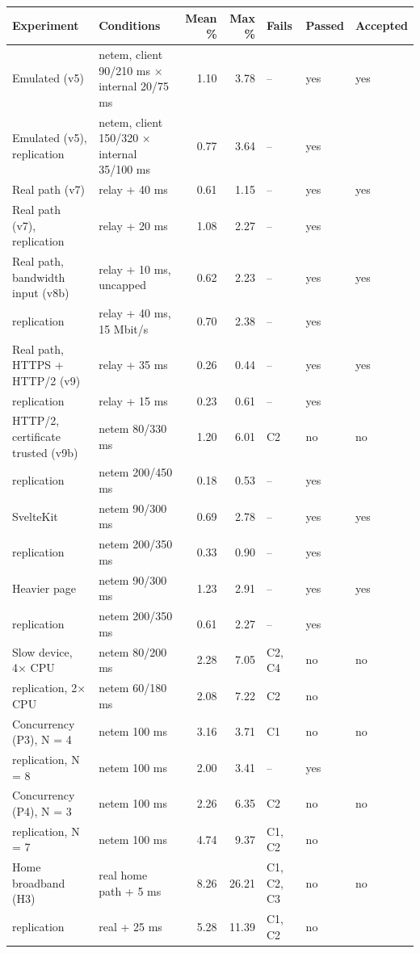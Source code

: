 \begin{tabularx}{\textwidth}{>{\raggedright\arraybackslash}p{4.3cm} X r r l l l}
\toprule
Experiment & Conditions & Mean \% & Max \% & Fails & Passed & Accepted \\
\midrule
Emulated (v5) & netem, client 90/210 ms × internal 20/75 ms & 1.10 & 3.78 & -- & yes & yes \\
Emulated (v5), replication & netem, client 150/320 × internal 35/100 ms & 0.77 & 3.64 & -- & yes &  \\
Real path (v7) & relay + 40 ms & 0.61 & 1.15 & -- & yes & yes \\
Real path (v7), replication & relay + 20 ms & 1.08 & 2.27 & -- & yes &  \\
Real path, bandwidth input (v8b) & relay + 10 ms, uncapped & 0.62 & 2.23 & -- & yes & yes \\
\quad replication & relay + 40 ms, 15 Mbit/s & 0.70 & 2.38 & -- & yes &  \\
Real path, HTTPS + HTTP/2 (v9) & relay + 35 ms & 0.26 & 0.44 & -- & yes & yes \\
\quad replication & relay + 15 ms & 0.23 & 0.61 & -- & yes &  \\
HTTP/2, certificate trusted (v9b) & netem 80/330 ms & 1.20 & 6.01 & C2 & no & no \\
\quad replication & netem 200/450 ms & 0.18 & 0.53 & -- & yes &  \\
SvelteKit & netem 90/300 ms & 0.69 & 2.78 & -- & yes & yes \\
\quad replication & netem 200/350 ms & 0.33 & 0.90 & -- & yes &  \\
Heavier page & netem 90/300 ms & 1.23 & 2.91 & -- & yes & yes \\
\quad replication & netem 200/350 ms & 0.61 & 2.27 & -- & yes &  \\
Slow device, 4× CPU & netem 80/200 ms & 2.28 & 7.05 & C2, C4 & no & no \\
\quad replication, 2× CPU & netem 60/180 ms & 2.08 & 7.22 & C2 & no &  \\
Concurrency (P3), N = 4 & netem 100 ms & 3.16 & 3.71 & C1 & no & no \\
\quad replication, N = 8 & netem 100 ms & 2.00 & 3.41 & -- & yes &  \\
Concurrency (P4), N = 3 & netem 100 ms & 2.26 & 6.35 & C2 & no & no \\
\quad replication, N = 7 & netem 100 ms & 4.74 & 9.37 & C1, C2 & no &  \\
Home broadband (H3) & real home path + 5 ms & 8.26 & 26.21 & C1, C2, C3 & no & no \\
\quad replication & real + 25 ms & 5.28 & 11.39 & C1, C2 & no &  \\
\bottomrule
\end{tabularx}
